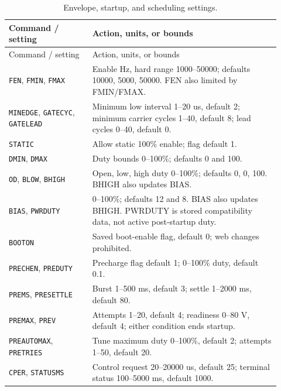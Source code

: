 \endgroup
\begingroup
\small
\begin{longtable}{@{}L{0.29\linewidth}L{0.63\linewidth}@{}}
\caption{Envelope, startup, and scheduling settings.}\label{tab:app-fw-timing-settings}\\
\toprule Command / setting & Action, units, or bounds\\\midrule
\endfirsthead
\toprule Command / setting & Action, units, or bounds\\\midrule
\endhead
\texttt{FEN}, \texttt{FMIN}, \texttt{FMAX} & Enable Hz, hard range 1000--50000; defaults 10000, 5000, 50000. FEN also limited by FMIN/FMAX.\\
\texttt{MINEDGE}, \texttt{GATECYC}, \texttt{GATELEAD} & Minimum low interval 1--20 us, default 2; minimum carrier cycles 1--40, default 8; lead cycles 0--40, default 0.\\
\texttt{STATIC} & Allow static 100\% enable; flag default 1.\\
\texttt{DMIN}, \texttt{DMAX} & Duty bounds 0--100\%; defaults 0 and 100.\\
\texttt{OD}, \texttt{BLOW}, \texttt{BHIGH} & Open, low, high duty 0--100\%; defaults 0, 0, 100. BHIGH also updates BIAS.\\
\texttt{BIAS}, \texttt{PWRDUTY} & 0--100\%; defaults 12 and 8. BIAS also updates BHIGH. PWRDUTY is stored compatibility data, not active post-startup duty.\\
\texttt{BOOTON} & Saved boot-enable flag, default 0; web changes prohibited.\\
\texttt{PRECHEN}, \texttt{PREDUTY} & Precharge flag default 1; 0--100\% duty, default 0.1.\\
\texttt{PREMS}, \texttt{PRESETTLE} & Burst 1--500 ms, default 3; settle 1--2000 ms, default 80.\\
\texttt{PREMAX}, \texttt{PREV} & Attempts 1--20, default 4; readiness 0--80 V, default 4; either condition ends startup.\\
\texttt{PREAUTOMAX}, \texttt{PRETRIES} & Tune maximum duty 0--100\%, default 2; attempts 1--50, default 20.\\
\texttt{CPER}, \texttt{STATUSMS} & Control request 20--20000 us, default 25; terminal status 100--5000 ms, default 1000.\\
\bottomrule
\end{longtable}
\endgroup
\begingroup
\small
